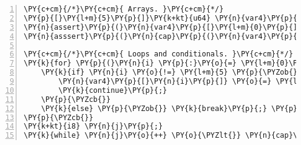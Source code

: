 \begin{Verbatim}[commandchars=\\\{\},numbers=left,firstnumber=1,stepnumber=1]
\PY{c+cm}{/*}\PY{c+cm}{ Arrays. }\PY{c+cm}{*/}
\PY{p}{[}\PY{l+m}{5}\PY{p}{]}\PY{k+kt}{u64} \PY{n}{var4}\PY{p}{;} \PY{c+c1}{// Unsigned 64\PYZhy{}bit int array of size 5.}
\PY{n}{assert}\PY{p}{(}\PY{n}{var4}\PY{p}{[}\PY{l+m}{0}\PY{p}{]} \PY{o}{==} \PY{n}{var1} \PY{o}{==} \PY{l+m}{0}\PY{p}{)}\PY{p}{;} \PY{c+c1}{// 0\PYZhy{}based indexing. Uninit. vars. are equal to 0.}
\PY{n}{asssert}\PY{p}{(}\PY{n}{cap}\PY{p}{(}\PY{n}{var4}\PY{p}{)} \PY{o}{==} \PY{n}{len}\PY{p}{(}\PY{n}{var4}\PY{p}{)} \PY{o}{==} \PY{l+m}{5}\PY{p}{)}\PY{p}{;} \PY{c+c1}{// cap(.) and len(.) get size of array.}

\PY{c+cm}{/*}\PY{c+cm}{ Loops and conditionals. }\PY{c+cm}{*/}
\PY{k}{for} \PY{p}{(}\PY{n}{i} \PY{p}{:}\PY{o}{=} \PY{l+m}{0}\PY{p}{;} \PY{n}{i} \PY{o}{\PYZlt{}} \PY{n}{cap}\PY{p}{(}\PY{n}{var4}\PY{p}{)}\PY{p}{;} \PY{n}{i}\PY{o}{++}\PY{p}{)} \PY{p}{\PYZob{}}
    \PY{k}{if} \PY{n}{i} \PY{o}{!=} \PY{l+m}{5} \PY{p}{\PYZob{}} \PY{c+c1}{// Parentheses are optional for conditionals.}
        \PY{n}{var4}\PY{p}{[}\PY{n}{i}\PY{p}{]} \PY{o}{=} \PY{l+m}{2} \PY{o}{\PYZlt{}\PYZlt{}} \PY{l+m}{1}\PY{p}{;}
        \PY{k}{continue}\PY{p}{;}
    \PY{p}{\PYZcb{}}
    \PY{k}{else} \PY{p}{\PYZob{}} \PY{k}{break}\PY{p}{;} \PY{p}{\PYZcb{}}
\PY{p}{\PYZcb{}}
\PY{k+kt}{i8} \PY{n}{j}\PY{p}{;}
\PY{k}{while} \PY{n}{j}\PY{o}{++} \PY{o}{\PYZlt{}} \PY{n}{cap}\PY{p}{(}\PY{n}{var4}\PY{p}{)} \PY{p}{\PYZob{}} \PY{n}{printf}\PY{p}{(}\PY{l+s}{\PYZdq{}\PYZpc{}d \PYZdq{}}\PY{p}{,} \PY{n}{var4}\PY{p}{[}\PY{n}{j}\PY{p}{]}\PY{p}{)}\PY{p}{;} \PY{p}{\PYZcb{}} \PY{c+c1}{// C\PYZhy{}styled printf.}
\end{Verbatim}
